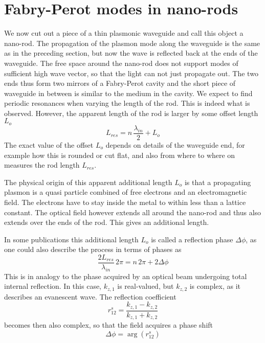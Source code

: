 

\section{Fabry-Perot modes in nano-rods}

We now cut out a piece of  a thin plasmonic waveguide and call this object a nano-rod. The propagation of the plasmon mode along the waveguide is the same as in the preceding section, but now the wave is reflected back at the ends of the waveguide. The free space around the nano-rod does not support modes of sufficient high wave vector, so that the light can not just propagate out. The two ends thus form two mirrors of a Fabry-Perot cavity and the short piece of waveguide in between is similar to the medium in the cavity. We expect to find periodic resonances when varying the length of the rod. This is indeed what is observed. However, the apparent length of the rod is larger by some offset length $L_o$
\begin{equation}
  L_{res} = n \, \frac{\lambda_{in}}{2} + L_{o}
\end{equation}
The exact value of the offset  $L_o$ depends on details of the waveguide end, for example how this is rounded or cut flat, and also from where to where on measures the rod length $L_{res}$.

The physical origin of this apparent additional length  $L_o$ is that a propagating plasmon is a quasi particle combined of free electrons and an electromagnetic field. The electrons have to stay inside the metal to within less than a lattice constant. The optical field however extends all around the nano-rod and thus also extends over the ends of the rod. This gives an additional length.

In some publications this additional length $L_o$ is called a reflection phase $\Delta \phi$, as one could also describe the process in terms of phases as
\begin{equation}
  \frac{2 L_{res}}{\lambda_{in}} \, 2 \pi = n \, 2 \pi + 2 \Delta \phi
\end{equation}
This is in analogy to the phase acquired by an optical beam undergoing total internal reflection. In this case, $k_{z,1}$ is real-valued, but $k_{z,2}$ is complex, as it describes an evanescent wave. The reflection coefficient 
\begin{equation}
  r_{12}^s =  \frac{k_{z,1} - k_{z,2}}{k_{z,1} + k_{z,2}}  
\end{equation}
becomes then also complex, so that the field acquires a phase shift 
\begin{equation}
  \Delta \phi = \arg (r_{12}^s)
\end{equation}

